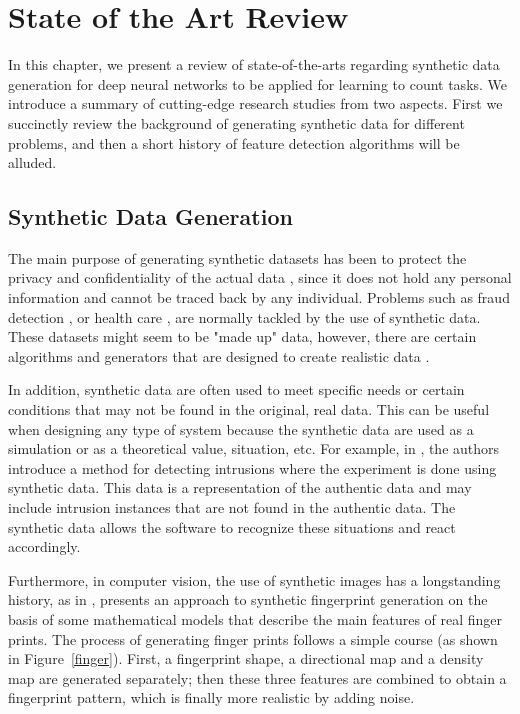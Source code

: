 \newpage
\chapter{State of the Art Review}
\label{sec:stateoftheart}

In this chapter, we present a review of state-of-the-arts regarding synthetic data generation for deep neural networks to be applied for learning to count tasks. We introduce a summary of cutting-edge research studies from two aspects. First we succinctly review the background of generating synthetic data for different problems, and then a short history of feature detection algorithms will be alluded.

\section{Synthetic Data Generation} 

The main purpose of generating synthetic datasets has been to protect the privacy and confidentiality of the actual data \cite{yao2015synthetic,phua2010comprehensive}, since it does not hold any personal information and cannot be traced back by any individual. Problems such as fraud detection \cite{phua2010comprehensive}, or health care \cite{yao2015synthetic}, are normally tackled by the use of synthetic data. These datasets might seem to be "made up" data, however, there are certain algorithms and generators that are designed to create realistic data \cite{yao2015synthetic,arasu2012synthetic}. 

In addition, synthetic data are often used to meet specific needs or certain conditions that may not be found in the original, real data. This can be useful when designing any type of system because the synthetic data are used as a simulation or as a theoretical value, situation, etc. For example, in \cite{hofmeyr1998intrusion}, the authors introduce a method for detecting intrusions where the experiment is done using synthetic data. This data is a representation of the authentic data and may include intrusion instances that are not found in the authentic data. The synthetic data allows the software to recognize these situations and react accordingly.

Furthermore, in computer vision, the use of synthetic images has a longstanding history, as in \citeyear{cappelli2000synthetic}, \citet*{cappelli2000synthetic} presents an approach to synthetic fingerprint generation on the basis of some mathematical models that describe the main features of real finger prints. The process of generating finger prints follows a simple course (as shown in Figure~\ref{finger}). First, a fingerprint shape, a directional map and a density map are generated separately; then these three features are combined to obtain a fingerprint pattern, which is finally more realistic by adding noise.


